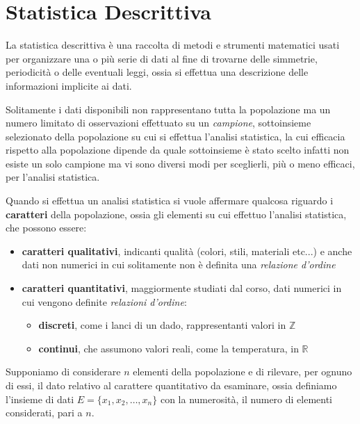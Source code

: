 \documentclass[a4paper,12pt, oneside]{book}
\newcommand{\numberset}{\mathbb}
\newcommand{\Z}{\numberset{Z}}
\newcommand{\R}{\numberset{R}}
\begin{document}
\chapter{Statistica Descrittiva}
La statistica descrittiva è una raccolta di metodi e strumenti matematici usati per organizzare una o più serie di dati
al fine di trovarne delle simmetrie, periodicità o delle eventuali leggi, ossia si effettua una descrizione 
delle informazioni implicite ai dati.

Solitamente i dati disponibili non rappresentano tutta la popolazione ma un numero limitato 
di osservazioni effettuato su un \emph{campione}, sottoinsieme selezionato della popolazione su cui si effettua
l'analisi statistica, la cui efficacia rispetto alla popolazione dipende da quale sottoinsieme è stato scelto
infatti non esiste un solo campione ma vi sono diversi modi per sceglierli, più o meno efficaci, per l'analisi statistica.

Quando si effettua un analisi statistica si vuole affermare qualcosa riguardo i \textbf{caratteri} della popolazione,
ossia gli elementi su cui effettuo l'analisi statistica, che possono essere:
\begin{itemize}
    \item \textbf{caratteri qualitativi}, indicanti qualità (colori, stili, materiali etc...) e anche dati non numerici
             in cui solitamente non è definita una \textit{relazione d'ordine}
    \item \textbf{caratteri quantitativi}, maggiormente studiati dal corso, dati numerici 
          in cui vengono definite \emph{relazioni d'ordine}:
        \begin{itemize}
            \item \textbf{discreti}, come i lanci di un dado, rappresentanti valori in $\Z$
            \item \textbf{continui}, che assumono valori reali, come la temperatura, in $\R$
        \end{itemize}
\end{itemize}
Supponiamo di considerare $n$ elementi della popolazione e di rilevare, per ognuno di essi,
il dato relativo al carattere quantitativo da esaminare, ossia definiamo l'insieme di dati
$E=\{x_1, x_2, \dots, x_n\}$ con la numerosità, il numero di elementi considerati, pari a $n$.
\end{document}
